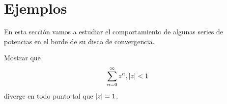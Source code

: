 \chapter{Ejemplos}


En esta sección vamos a estudiar el comportamiento de algunas series de potencias en el borde de su disco de convergencia.


\begin{example}
    Mostrar que
    \begin{equation*}
        \sum_{n=0}^{\infty} z^n, \left\lvert z\right\rvert < 1
    \end{equation*}
    diverge en todo punto tal que $\left\lvert z\right\rvert = 1$.
\end{example}

